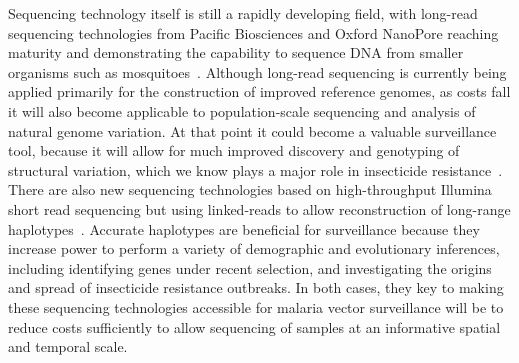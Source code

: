 \begin{refsection}
Sequencing technology itself is still a rapidly developing field, with long-read sequencing technologies from Pacific Biosciences and Oxford NanoPore reaching maturity and demonstrating the capability to sequence DNA from smaller organisms such as mosquitoes~\parencite{Kingan2019,Ghurye2019,Zamyatin2020}.
%
Although long-read sequencing is currently being applied primarily for the construction of improved reference genomes, as costs fall it will also become applicable to population-scale sequencing and analysis of natural genome variation.
%
At that point it could become a valuable surveillance tool, because it will allow for much improved discovery and genotyping of structural variation, which we know plays a major role in insecticide resistance~\parencite{Lucas2019}.
%
There are also new sequencing technologies based on high-throughput Illumina short read sequencing but using linked-reads to allow reconstruction of long-range haplotypes~\parencite{Mostovoy2016}.
%
Accurate haplotypes are beneficial for surveillance because they increase power to perform a variety of demographic and evolutionary inferences, including identifying genes under recent selection, and investigating the origins and spread of insecticide resistance outbreaks.
%
In both cases, they key to making these sequencing technologies accessible for malaria vector surveillance will be to reduce costs sufficiently to allow sequencing of samples at an informative spatial and temporal scale.



\end{refsection}
